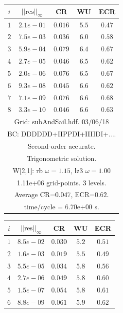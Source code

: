 \begin{table}[hbt]
\begin{center}
{\tablefontsize
\begin{tabular}{|c|c|c|c|c|} \hline 
 $i$   & $\vert\vert\mbox{res}\vert\vert_\infty$  &  CR     &  WU    & ECR  \\   \hline 
 $ 1$  & $ 2.1e-01$ & $0.016$ & $ 5.5$ & $0.47$ \\ 
 $ 2$  & $ 7.5e-03$ & $0.036$ & $ 6.0$ & $0.58$ \\ 
 $ 3$  & $ 5.9e-04$ & $0.079$ & $ 6.4$ & $0.67$ \\ 
 $ 4$  & $ 2.7e-05$ & $0.046$ & $ 6.5$ & $0.62$ \\ 
 $ 5$  & $ 2.0e-06$ & $0.076$ & $ 6.5$ & $0.67$ \\ 
 $ 6$  & $ 9.3e-08$ & $0.045$ & $ 6.6$ & $0.62$ \\ 
 $ 7$  & $ 7.1e-09$ & $0.076$ & $ 6.6$ & $0.68$ \\ 
 $ 8$  & $ 3.3e-10$ & $0.046$ & $ 6.6$ & $0.63$ \\ 
\hline 
\multicolumn{5}{|c|}{Grid: subAndSail.hdf. 03/06/18}  \\
\multicolumn{5}{|c|}{BC: DDDDDD+IIPPDI+IIIIDI+....}  \\
\multicolumn{5}{|c|}{Second-order accurate.}  \\
\multicolumn{5}{|c|}{Trigonometric solution.}  \\
\multicolumn{5}{|c|}{W[2,1]: rb $\omega=1.15$, lz3 $\omega=1.00$}  \\
\multicolumn{5}{|c|}{1.11e+06 grid-points. 3 levels.}  \\
\multicolumn{5}{|c|}{Average CR=$0.047$, ECR=$0.62$.}  \\
\multicolumn{5}{|c|}{time/cycle = 6.70e+00 s.}  \\
\hline 
\end{tabular}
\begin{tabular}{|c|c|c|c|c|} \hline 
 $i$   & $\vert\vert\mbox{res}\vert\vert_\infty$  &  CR     &  WU    & ECR  \\   \hline 
 $ 1$  & $ 8.5e-02$ & $0.030$ & $ 5.2$ & $0.51$ \\ 
 $ 2$  & $ 1.6e-03$ & $0.019$ & $ 5.5$ & $0.49$ \\ 
 $ 3$  & $ 5.5e-05$ & $0.034$ & $ 5.8$ & $0.56$ \\ 
 $ 4$  & $ 2.7e-06$ & $0.049$ & $ 5.8$ & $0.60$ \\ 
 $ 5$  & $ 1.5e-07$ & $0.054$ & $ 5.8$ & $0.61$ \\ 
 $ 6$  & $ 8.8e-09$ & $0.061$ & $ 5.9$ & $0.62$ \\ 

\end{tabular}}
\end{center}
\end{table}
